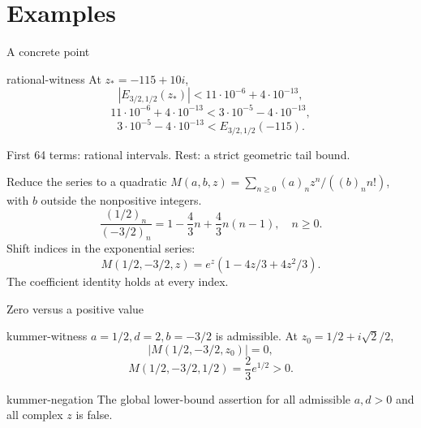 \documentclass{beamer}
\begin{document}
\section{Examples}
\begin{frame}{A concrete point}
\begin{bookresult}{rational-witness}
At $z_*=-115+10i$,
\[
|E_{3/2,1/2}(z_*)|{<} 11\cdot10^{-6}+4\cdot10^{-13},
\]
\[
11\cdot10^{-6}+4\cdot10^{-13}{<} 3\cdot10^{-5}-4\cdot10^{-13},
\]
\[
3\cdot10^{-5}-4\cdot10^{-13}{<} E_{3/2,1/2}(-115).
\]
\end{bookresult}
First 64 terms: rational intervals. Rest: a strict geometric tail bound.
\end{frame}
\begin{frame}{Reduce the series to a quadratic}
$M(a,b,z)=\sum_{n\ge0}(a)_n z^n/((b)_n n!)$, with $b$ outside the nonpositive integers.
\[
\frac{(1/2)_n}{(-3/2)_n}=1-\frac43n+\frac43n(n-1),\quad n\ge0.
\]
Shift indices in the exponential series:
\[
M(1/2,-3/2,z)=e^z(1-4z/3+4z^2/3).
\]
The coefficient identity holds at every index.
\end{frame}
\begin{frame}{Zero versus a positive value}
\begin{bookresult}{kummer-witness}
$a=1/2,d=2,b=-3/2$ is admissible. At $z_0=1/2+i\sqrt2/2$,
\[
|M(1/2,-3/2,z_0)|=0,
\]
\[
M(1/2,-3/2,1/2)=\frac23e^{1/2}>0.
\]
\end{bookresult}
\begin{bookresult}{kummer-negation}
The global lower-bound assertion for all admissible $a,d>0$ and all complex $z$ is false.
\end{bookresult}
\end{frame}
\end{document}
